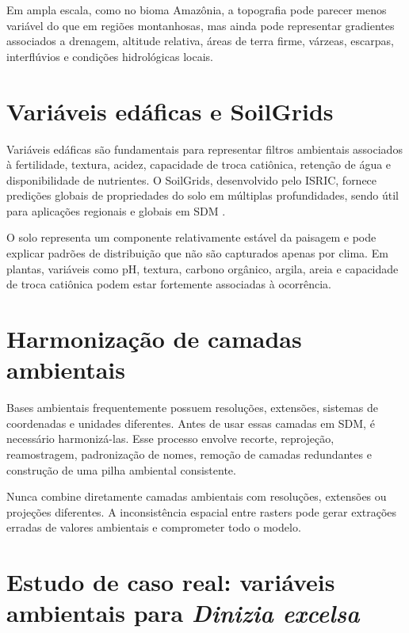 Em ampla escala, como no bioma Amazônia, a topografia pode parecer menos variável do que em regiões montanhosas, mas ainda pode representar gradientes associados a drenagem, altitude relativa, áreas de terra firme, várzeas, escarpas, interflúvios e condições hidrológicas locais.

\section{Variáveis edáficas e SoilGrids}

Variáveis edáficas são fundamentais para representar filtros ambientais associados à fertilidade, textura, acidez, capacidade de troca catiônica, retenção de água e disponibilidade de nutrientes. O SoilGrids, desenvolvido pelo ISRIC, fornece predições globais de propriedades do solo em múltiplas profundidades, sendo útil para aplicações regionais e globais em SDM \parencite{poggio2021soilgrids}.

\begin{conceito}[title={\faBook\quad Solo como filtro ecológico}]
	O solo representa um componente relativamente estável da paisagem e pode explicar padrões de distribuição que não são capturados apenas por clima. Em plantas, variáveis como pH, textura, carbono orgânico, argila, areia e capacidade de troca catiônica podem estar fortemente associadas à ocorrência.
\end{conceito}

\section{Harmonização de camadas ambientais}

Bases ambientais frequentemente possuem resoluções, extensões, sistemas de coordenadas e unidades diferentes. Antes de usar essas camadas em SDM, é necessário harmonizá-las. Esse processo envolve recorte, reprojeção, reamostragem, padronização de nomes, remoção de camadas redundantes e construção de uma pilha ambiental consistente.

\begin{atencao}[title={\faExclamationTriangle\quad Harmonização antes da modelagem}]
	Nunca combine diretamente camadas ambientais com resoluções, extensões ou projeções diferentes. A inconsistência espacial entre rasters pode gerar extrações erradas de valores ambientais e comprometer todo o modelo.
\end{atencao}

\section{Estudo de caso real: variáveis ambientais para \textit{Dinizia excelsa}}

